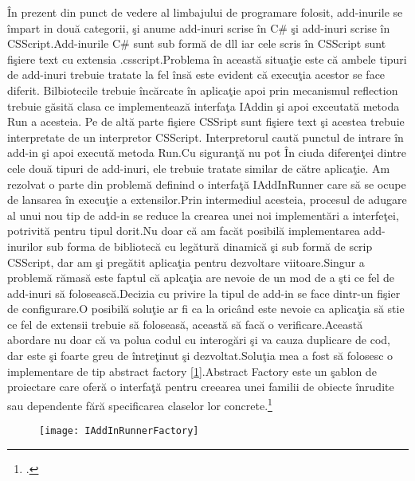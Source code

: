 \documentclass[a4paper,12pt]{report}
\let\oldref\ref
\renewcommand{\ref}[1]{[\oldref{#1}]}
\begin{document}
\^In prezent din punct de vedere al limbajului de programare folosit, add-inurile se \^impart in dou\u a categorii, \c si
anume add-inuri scrise \^in C\# \c si add-inuri scrise \^in CSScript.Add-inurile C\# sunt sub form\u a de dll iar 
cele scris \^in CSScript sunt fi\c siere text cu extensia .csscript.Problema \^in aceast\u a situa\c tie este c\u a 
ambele tipuri de add-inuri trebuie tratate la fel \^ins\u a este evident c\u a execu\c tia acestor se face diferit.
Bilbiotecile trebuie \^inc\u arcate \^in aplica\c tie apoi prin mecanismul reflection trebuie g\u asit\u a 
clasa ce implementeaz\u a interfa\c ta IAddin \c si apoi exceutat\u a metoda Run a acesteia.
Pe de alt\u a parte fi\c siere CSSript sunt fi\c siere text \c si acestea trebuie interpretate de un interpretor CSScript.
Interpretorul caut\u a punctul de intrare \^in add-in \c si apoi execut\u a metoda Run.Cu siguran\c t\u a nu pot \^In ciuda diferen\c tei dintre 
cele dou\u a tipuri de add-inuri, ele trebuie tratate similar de c\u atre aplica\c tie.
Am rezolvat o parte din problem\u a definind o interfa\c t\u a IAddInRunner care s\u a se ocupe de lansarea \^in execu\c tie 
a extensilor.Prin intermediul acesteia, procesul de ad\a ugare al unui nou tip de add-in se reduce la crearea unei noi
implement\u ari a interfe\c tei, potrivit\u a pentru tipul dorit.Nu doar c\u a am fac\u at posibil\u a implementarea add-inurilor
 sub forma de bibliotec\u a cu leg\u atur\u a dinamic\u a \c si sub form\u a de scrip CSScript, dar am \c si preg\u atit
 aplica\c tia pentru dezvoltare viitoare.Singur a problem\u a r\u amas\u a este faptul c\u a aplca\c tia are nevoie de un mod
 de a \c sti ce fel de add-inuri s\u a foloseasc\u a.Decizia cu privire la tipul de add-in se face dintr-un fi\c sier de 
 configurare.O posibil\u a solu\c tie ar fi ca la oric\^and este nevoie ca aplica\c tia s\u a stie ce fel de extensii trebuie 
 s\u a foloseas\u a, aceast\u a s\u a fac\u a o verificare.Aceast\u a abordare nu doar c\u a va polua codul cu interog\u ari
 \c si va cauza duplicare de cod, dar este \c si foarte greu de \^intre\c tinut \c si dezvoltat.Solu\c tia mea a fost
s\u a folosesc o implementare de tip abstract factory \ref{fig:IAddInRunnerFactory}.Abstract Factory este un \c sablon de proiectare care ofer\u a 
o interfa\c t\u a pentru creearea unei familii de obiecte \^inrudite sau dependente f\u ar\u a specificarea claselor
lor concrete.\footcite{Freeman:2004:HFD:1076324} 

\begin{figure}[!ht]
	\texttt{[image: IAddInRunnerFactory]}
	\label{fig:IAddInRunnerFactory}
\end{figure}
\end{document}
